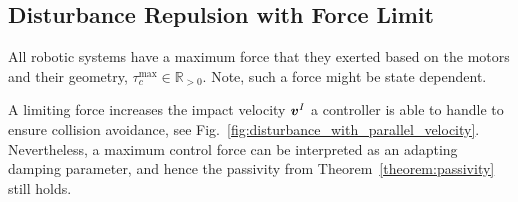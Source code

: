 \subsection{Disturbance Repulsion with Force Limit}
All robotic systems have a maximum force that they  exerted based on the motors and their geometry, $\tau_c^{\mathrm{max}} \in \mathbb{R}_{>0}$. Note, such a force might be state dependent.

A limiting force increases the impact velocity $\boldsymbol{v}^I$ a controller is able to handle to ensure collision avoidance, see Fig.~\ref{fig:disturbance_with_parallel_velocity}. Nevertheless, a maximum control force can be interpreted as an adapting damping parameter, and hence the passivity from Theorem~\ref{theorem:passivity} still holds.




